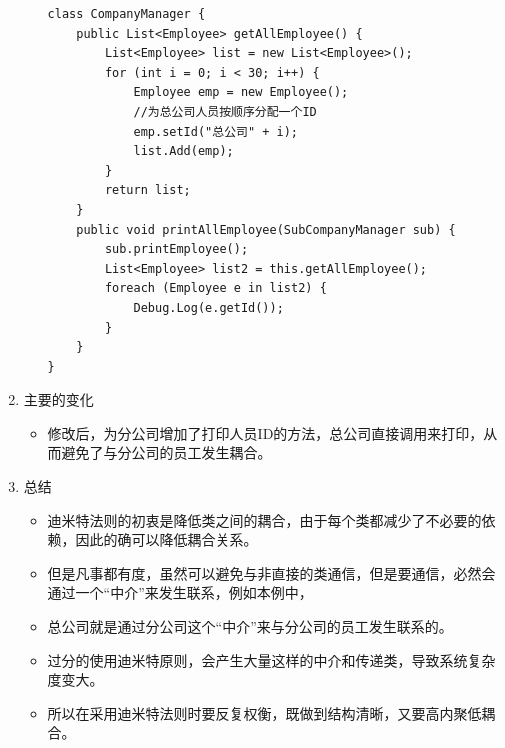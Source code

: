 \documentclass[9pt, b5paper]{article}
\begin{document}
\begin{enumerate}
\begin{itemize}
\begin{verbatim}
class CompanyManager {
    public List<Employee> getAllEmployee() {
        List<Employee> list = new List<Employee>();
        for (int i = 0; i < 30; i++) {
            Employee emp = new Employee();
            //为总公司人员按顺序分配一个ID
            emp.setId("总公司" + i);
            list.Add(emp);
        }
        return list;
    }
    public void printAllEmployee(SubCompanyManager sub) {
        sub.printEmployee();
        List<Employee> list2 = this.getAllEmployee();
        foreach (Employee e in list2) {
            Debug.Log(e.getId());
        }
    }
}
\end{verbatim}
\end{itemize}
\item 主要的变化
\label{sec:org314429a}
\begin{itemize}
\item 修改后，为分公司增加了打印人员ID的方法，总公司直接调用来打印，从而避免了与分公司的员工发生耦合。
\end{itemize}
\item 总结
\label{sec:orgac9da99}
\begin{itemize}
\item 迪米特法则的初衷是降低类之间的耦合，由于每个类都减少了不必要的依赖，因此的确可以降低耦合关系。
\item 但是凡事都有度，虽然可以避免与非直接的类通信，但是要通信，必然会通过一个“中介”来发生联系，例如本例中，
\item 总公司就是通过分公司这个“中介”来与分公司的员工发生联系的。
\item 过分的使用迪米特原则，会产生大量这样的中介和传递类，导致系统复杂度变大。
\item 所以在采用迪米特法则时要反复权衡，既做到结构清晰，又要高内聚低耦合。
\end{itemize}
\end{enumerate}
\end{document}
